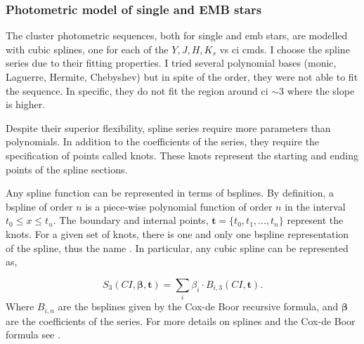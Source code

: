 \subsubsection{Photometric model of single and EMB stars}
\label{sect:cluster_ph}

The cluster photometric sequences, both for single and \gls{emb} stars, are modelled with cubic splines, one for each of the $Y,J,H,K_s$ vs \gls{ci} \glspl{cmd}. I choose the spline series due to their fitting properties. I tried several polynomial bases (monic, Laguerre, Hermite, Chebyshev) but in spite of the order, they were not able to fit the sequence. In specific, they do not fit the region around \gls{ci} $\sim 3$ where the slope is higher. 

Despite their superior flexibility, spline series require more parameters than polynomials. In addition to the coefficients of the series, they require the specification of points called knots. These knots represent the starting and ending points of the spline sections. 

Any spline function can be represented in terms of \glspl{bspline}. By definition, a \gls{bspline} of order $n$ is a piece-wise polynomial function of order $n$ in the interval $t_0 \leq x \leq t_n$. The boundary and internal points, $\mathbf{t}=\{t_0,t_1,...,t_n\}$ represent the knots. For a given set of knots, there is one and only one \gls{bspline} representation of the spline, thus the name .  In particular, any cubic spline can be represented as,

\begin{equation}
\label{eq:spline_cubic}
S_3(CI,\boldsymbol{\beta},\mathbf{t}) = \sum_i \beta_i\cdot B_{i,3}(CI,\mathbf{t}).
\end{equation}
Where $B_{i,n}$ are the \glspl{bspline} given by the Cox-de Boor recursive formula, and $\boldsymbol{\beta}$ are the coefficients of the series. For more details on splines and the Cox-de Boor formula see \citet{deBoor1978}.


